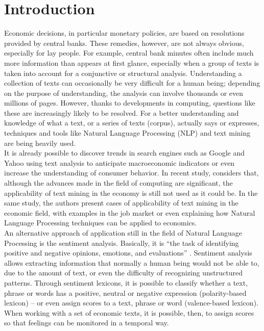 \chapter{\textbf{Introduction}}  \label{introduction}

Economic decisions, in particular monetary policies, are based on resolutions provided by central banks. These remedies, however, are not always obvious, especially for lay people. For example, central bank minutes often include much more information than appears at first glance, especially when a group of texts is taken into account for a conjunctive or structural analysis. Understanding a collection of texts can occasionally be very difficult for a human being; depending on the purpose of understanding, the analysis can involve thousands or even millions of pages. However, thanks to developments in computing, questions like these are increasingly likely to be resolved. For a better understanding and knowledge of what a text, or a series of texts (corpus), actually says or expresses, techniques and tools like Natural Language Processing (NLP) and text mining are being heavily used.\\

It is already possible to discover trends in search engines such as Google and Yahoo using text analysis to anticipate macroeconomic indicators or even increase the understanding of consumer behavior. In recent study, \cite{bholat2015text} considers that, although the advances made in the field of computing are significant, the applicability of text mining in the economy is still not used as it could be. In the same study, the authors present cases of applicability of text mining in the economic field, with examples in the job market or even explaining how Natural Language Processing techniques can be applied to economics.\\

An alternative approach of application still in the field of Natural Language Processing is the sentiment analysis. Basically, it is “the task of identifying positive and negative opinions, emotions, and evaluations” \cite[]{wilson2005}. Sentiment analysis allows extracting information that normally a human being would not be able to, due to the amount of text, or even the difficulty of recognizing unstructured patterns. Through sentiment lexicons, it is possible to classify whether a text, phrase or words has a positive, neutral or negative expression (polarity-based lexicon) -- or even assign scores to a text, phrase or word (valence-based lexicon). When working with a set of economic texts, it is possible, then, to assign scores so that feelings can be monitored in a temporal way.\\	

